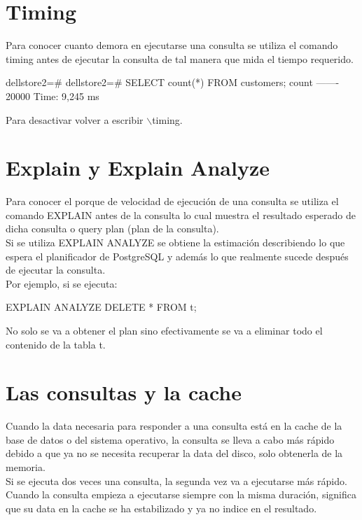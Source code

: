 \section{Timing}

Para conocer cuanto demora en ejecutarse una consulta se utiliza el comando timing antes de ejecutar la consulta de tal manera que mida el tiempo requerido.\\

\begin{pyglist}
dellstore2=# \timing
dellstore2=# SELECT count(*) FROM customers;
count 
------- 
20000 
Time: 9,245 ms
\end{pyglist}

Para desactivar volver a escribir $\backslash$timing.

\section{Explain y Explain Analyze}

Para conocer el porque de velocidad de ejecución de una consulta se utiliza el comando EXPLAIN antes de la consulta lo cual muestra el resultado esperado de dicha consulta o query plan (plan de la consulta).\\

Si se utiliza EXPLAIN ANALYZE se obtiene la estimación describiendo lo que espera el planificador de PostgreSQL y además lo que realmente sucede después de ejecutar la consulta.\\

Por ejemplo, si se ejecuta:\\

\begin{pyglist}
EXPLAIN ANALYZE DELETE * FROM t;
\end{pyglist}

No solo se va a obtener el plan sino efectivamente se va a eliminar todo el contenido de la tabla t.

\section{Las consultas y la cache}

Cuando la data necesaria para responder a una consulta está en la cache de la base de datos o del sistema operativo, la consulta se lleva a cabo más rápido debido a que ya no se necesita recuperar la data del disco, solo obtenerla de la memoria.\\

Si se ejecuta dos veces una consulta, la segunda vez va a ejecutarse más rápido. Cuando la consulta empieza a ejecutarse siempre con la misma duración, significa que su data en la cache se ha estabilizado y ya no indice en el resultado. \cite{GregorySmith2010}

